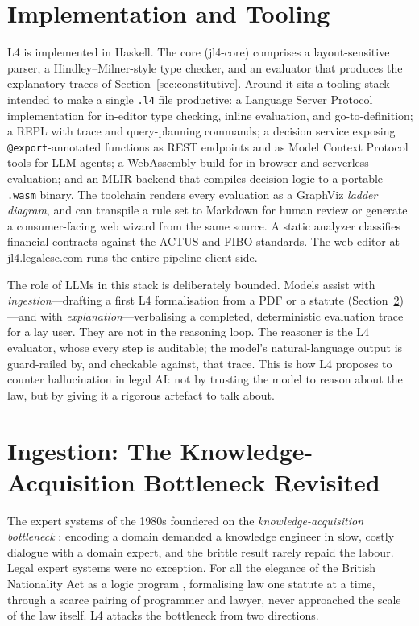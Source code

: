 \documentclass[sigconf,nonacm]{acmart}
\newcommand{\code}[1]{\texttt{\small #1}}
\begin{document}
\section{Implementation and Tooling}\label{sec:impl}
L4 is implemented in Haskell. The core (\textsf{jl4-core}) comprises a
layout-sensitive parser, a Hindley--Milner-style type checker, and an
evaluator that produces the explanatory traces of
Section~\ref{sec:constitutive}. Around it sits a tooling stack intended to
make a single \code{.l4} file productive: a Language Server Protocol
implementation for in-editor type checking, inline evaluation, and
go-to-definition; a REPL with trace and query-planning commands; a decision
service exposing \code{@export}-annotated functions as REST endpoints and as
Model Context Protocol tools for LLM agents; a WebAssembly build for
in-browser and serverless evaluation; and an MLIR backend that compiles
decision logic to a portable \code{.wasm} binary. The toolchain renders
every evaluation as a GraphViz \emph{ladder diagram}, and can transpile a
rule set to Markdown for human review or generate a consumer-facing web
wizard from the same source. A static analyzer classifies financial
contracts against the ACTUS and FIBO standards. The web editor at
\textsf{jl4.legalese.com} runs the entire pipeline client-side.

The role of LLMs in this stack is deliberately bounded. Models assist with
\emph{ingestion}---drafting a first L4 formalisation from a PDF or a statute
(Section~\ref{sec:ingestion})---and with \emph{explanation}---verbalising a
completed, deterministic evaluation trace for a lay user. They are not in the
reasoning loop. The reasoner is the L4 evaluator, whose every step is
auditable; the model's natural-language output is guard-railed by, and
checkable against, that trace. This is how L4 proposes to counter
hallucination in legal AI: not by trusting the model to reason about the
law, but by giving it a rigorous artefact to talk about.

\section{Ingestion: The Knowledge-Acquisition Bottleneck Revisited}\label{sec:ingestion}
The expert systems of the 1980s foundered on the
\emph{knowledge-acquisition bottleneck}
\cite{feigenbaum1984,hayesroth1983}: encoding a domain demanded a knowledge
engineer in slow, costly dialogue with a domain expert, and the brittle
result rarely repaid the labour. Legal expert systems were no exception. For
all the elegance of the British Nationality Act as a logic program
\cite{sergot1986bna}, formalising law one statute at a time, through a scarce
pairing of programmer and lawyer, never approached the scale of the law
itself. L4 attacks the bottleneck from two directions.
\end{document}
